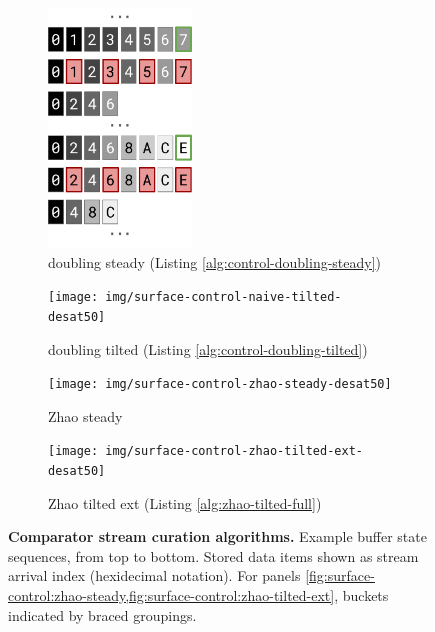 \begin{figure}
\begin{subfigure}{0.25\linewidth}
\centering
\includegraphics[height=2.5in]{img/surface-control-naive-steady}
\caption{doubling steady (Listing \ref{alg:control-doubling-steady})}
\label{fig:surface-control:naive-steady}
\end{subfigure}%
\begin{subfigure}{0.25\linewidth}
\centering
\texttt{[image: img/surface-control-naive-tilted-desat50]}
\caption{doubling tilted (Listing \ref{alg:control-doubling-tilted})}
\label{fig:surface-control:naive-tilted}
\end{subfigure}%
\begin{subfigure}{0.25\linewidth}
\centering
\texttt{[image: img/surface-control-zhao-steady-desat50]}
\caption{Zhao steady \cite{zhao2005generalized}}
\label{fig:surface-control:zhao-steady}
\end{subfigure}%
\begin{subfigure}{0.25\linewidth}
\centering
\texttt{[image: img/surface-control-zhao-tilted-ext-desat50]}
\caption{Zhao tilted ext (Listing \ref{alg:zhao-tilted-full})}
\label{fig:surface-control:zhao-tilted-ext}
\end{subfigure}%

\caption{%
\textbf{Comparator stream curation algorithms.}
\footnotesize
Example buffer state sequences, from top to bottom.
Stored data items shown as stream arrival index (hexidecimal notation).
For panels \cref{fig:surface-control:zhao-steady,fig:surface-control:zhao-tilted-ext}, buckets indicated by braced groupings.
}
\label{fig:surface-control}

\end{figure}
